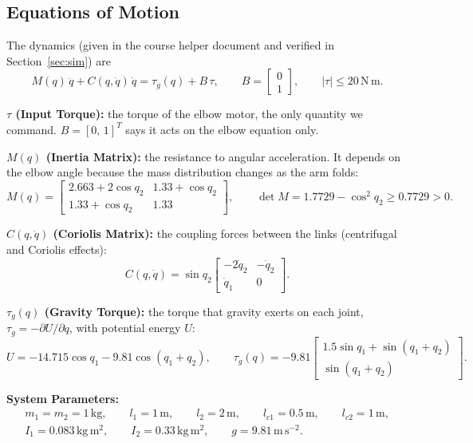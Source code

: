\documentclass[12pt,a4paper]{article}
\newcommand{\Nm}{\,\mathrm{N\,m}}
\begin{document}
\subsection{Equations of Motion}
The dynamics (given in the course helper document and verified in Section~\ref{sec:sim}) are
\begin{equation}
M(q)\,\ddot q+C(q,\dot q)\,\dot q=\tau_g(q)+B\,\tau,\qquad B=\begin{bmatrix}0\\1\end{bmatrix},\qquad |\tau|\le 20\Nm .\label{eq:eom}
\end{equation}

\textbf{$\tau$ (Input Torque):} the torque of the elbow motor, the only quantity we command. $B=[0,\,1]^T$ says it acts on the elbow equation only.

\textbf{$M(q)$ (Inertia Matrix):} the resistance to angular acceleration. It depends on the elbow angle because the mass distribution changes as the arm folds:
\begin{equation}
M(q)=\begin{bmatrix}2.663+2\cos q_2 & 1.33+\cos q_2\\ 1.33+\cos q_2 & 1.33\end{bmatrix},\qquad \det M=1.7729-\cos^2q_2\ge0.7729>0 .
\end{equation}

\textbf{$C(q,\dot q)$ (Coriolis Matrix):} the coupling forces between the links (centrifugal and Coriolis effects):
\begin{equation}
C(q,\dot q)=\sin q_2\begin{bmatrix}-2\dot q_2 & -\dot q_2\\ \dot q_1 & 0\end{bmatrix}.
\end{equation}

\textbf{$\tau_g(q)$ (Gravity Torque):} the torque that gravity exerts on each joint, $\tau_g=-\partial U/\partial q$, with potential energy $U$:
\begin{equation}
U=-14.715\cos q_1-9.81\cos(q_1+q_2),\qquad
\tau_g(q)=-9.81\begin{bmatrix}1.5\sin q_1+\sin(q_1+q_2)\\ \sin(q_1+q_2)\end{bmatrix}.
\end{equation}

\textbf{System Parameters:}
\begin{gather*}
m_1=m_2=1\,\mathrm{kg},\qquad l_1=1\,\mathrm m,\qquad l_2=2\,\mathrm m,\qquad l_{c1}=0.5\,\mathrm m,\qquad l_{c2}=1\,\mathrm m,\\
I_1=0.083\,\mathrm{kg\,m^2},\qquad I_2=0.33\,\mathrm{kg\,m^2},\qquad g=9.81\,\mathrm{m\,s^{-2}}.
\end{gather*}
\end{document}
